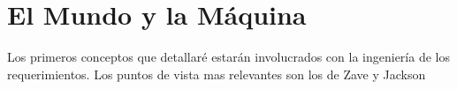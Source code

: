 \section{El Mundo y la Máquina}

Los primeros conceptos que detallaré estarán involucrados con la ingeniería de los requerimientos. Los puntos de vista
mas relevantes son los de Zave y Jackson
